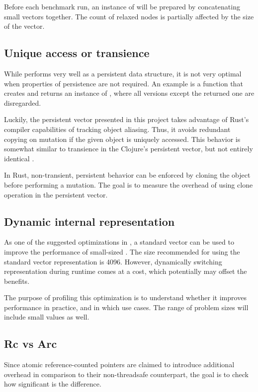 Before each benchmark run, an instance of \rrbvec{} will be prepared by concatenating small vectors together. The count of relaxed nodes is partially affected by the size of the vector. 

\subsection{Unique access or transience}
While \rrbvec{} performs very well as a persistent data structure, it is not very optimal when properties of persistence are not required. An example is a function that creates and returns an instance of \rrbvec{}, where all versions except the returned one are disregarded.

Luckily, the persistent vector presented in this project takes advantage of Rust's compiler capabilities of tracking object aliasing. Thus, it avoids redundant copying on mutation if the given object is uniquely accessed. This behavior is somewhat similar to transience in the Clojure's persistent vector, but not entirely identical \cite{improving-performance-through-transience}. 

In Rust, non-transient, persistent behavior can be enforced by cloning the object before performing a mutation. The goal is to measure the overhead of using clone operation in the persistent vector. 

\subsection{Dynamic internal representation}
As one of the suggested optimizations in \cite{rrb-vector-practical-general-purpose-im-sequence}, a standard vector can be used to improve the performance of small-sized \rrbvec{}. The size recommended for using the standard vector representation is 4096. However, dynamically switching representation during runtime comes at a cost, which potentially may offset the benefits.

The purpose of profiling this optimization is to understand whether it improves performance in practice, and in which use cases. The range of problem sizes will include small values as well. 

\subsection{Rc vs Arc}
Since atomic reference-counted pointers are claimed to introduce additional overhead in comparison to their non-threadsafe counterpart, the goal is to check how significant is the difference. 

